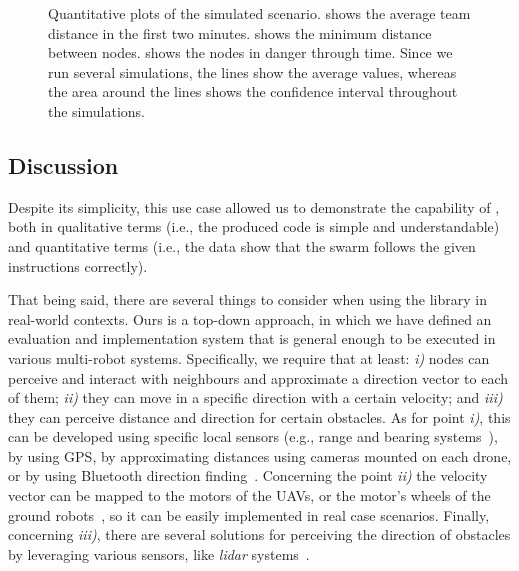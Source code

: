 \begin{figure}[t]
\begin{subfigure}{0.4\textwidth}
  \caption{}
  \label{fig:danger}
\end{subfigure}
\caption[Quantitative plots of the simulated scenario in \MacroSwarm{}.]{
  Quantitative plots of the simulated scenario. 
   shows the average team distance in the first two minutes. 
   shows the minimum distance between nodes. 
   shows the nodes in danger through time. 
  Since we run several simulations, 
   the lines show the average values, whereas 
   the area around the lines shows the confidence interval throughout the simulations.
}\label{fig:results}
\end{figure}

\subsection{Discussion}\label{subsec:discussion}
%
Despite its simplicity, 
this use case allowed us to demonstrate the capability of \MacroSwarm{}, both in qualitative terms (i.e., the produced code is simple and understandable) and quantitative terms (i.e., the data show that the swarm follows the given instructions correctly).

That being said, there are several things to consider when using the library in real-world contexts. Ours is a top-down approach, in which we have defined an evaluation and implementation system that is general enough to be executed in various multi-robot systems. Specifically, we require that at least: 
\emph{i)} nodes can perceive and interact with neighbours and approximate a direction vector to each of them; 
\emph{ii)} they can move in a specific direction with a certain velocity; and 
\emph{iii)} they can perceive distance and direction for certain obstacles.
%
As for point \emph{i)}, this can be developed using specific local sensors (e.g., range and bearing systems~\cite{DBLP:conf/antsw/BilalogluSAST22}), by using GPS, by approximating distances using cameras mounted on each drone, or by using Bluetooth direction finding~\cite{DBLP:conf/wcnc/SambuW22}.
% 
Concerning the point \emph{ii)} the velocity vector can be mapped to the motors of the UAVs, or the motor's wheels of the ground robots~\cite{DBLP:conf/icra/KorenB91}, so it can be easily implemented in real case scenarios.
%
Finally, concerning \emph{iii)}, there are several solutions for perceiving the direction of obstacles by leveraging various sensors, like \emph{\ac{lidar}} systems~\cite{DBLP:conf/icinfa/PengQZXLG15}.

